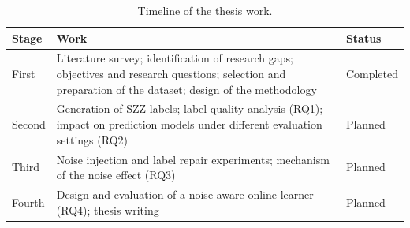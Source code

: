 \documentclass[12pt,a4paper,oneside]{report}
\begin{document}
\begin{table}[htbp]
\centering\small
\caption{Timeline of the thesis work.}
\label{tab:timeline}
\begin{tabularx}{\linewidth}{@{}l>{\raggedright\arraybackslash}Xl@{}}
\toprule
Stage & Work & Status \\
\midrule
First & Literature survey; identification of research gaps; objectives and
research questions; selection and preparation of the dataset; design of the
methodology & Completed \\
Second & Generation of SZZ labels; label quality analysis (RQ1); impact on
prediction models under different evaluation settings (RQ2) & Planned \\
Third & Noise injection and label repair experiments; mechanism of the
noise effect (RQ3) & Planned \\
Fourth & Design and evaluation of a noise-aware online learner (RQ4); thesis
writing & Planned \\
\bottomrule
\end{tabularx}
\end{table}
\end{document}
